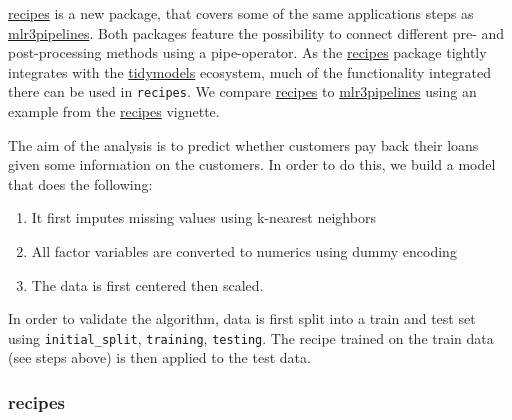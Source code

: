 \documentclass[]{scrbook}
\providecommand{\tightlist}{%
  \setlength{\itemsep}{0pt}\setlength{\parskip}{0pt}}
\begin{document}
\href{https://cran.r-project.org/package=recipes}{recipes} is a new package, that covers some of the same applications steps as \href{https://cran.r-project.org/package=mlr3pipelines}{mlr3pipelines}.
Both packages feature the possibility to connect different pre- and post-processing methods using a pipe-operator.
As the \href{https://cran.r-project.org/package=recipes}{recipes} package tightly integrates with the \href{https://cran.r-project.org/package=tidymodels}{tidymodels} ecosystem, much of the functionality integrated there can be used in \texttt{recipes}.
We compare \href{https://cran.r-project.org/package=recipes}{recipes} to \href{https://cran.r-project.org/package=mlr3pipelines}{mlr3pipelines} using an example from the \href{https://cran.r-project.org/package=recipes}{recipes} vignette.

The aim of the analysis is to predict whether customers pay back their loans given some information on the customers.
In order to do this, we build a model that does the following:

\begin{enumerate}
\def\labelenumi{\arabic{enumi}.}
\tightlist
\item
  It first imputes missing values using k-nearest neighbors
\item
  All factor variables are converted to numerics using dummy encoding
\item
  The data is first centered then scaled.
\end{enumerate}

In order to validate the algorithm, data is first split into a train and test set using \texttt{initial\_split}, \texttt{training}, \texttt{testing}.
The recipe trained on the train data (see steps above) is then applied to the test data.

\hypertarget{recipes}{%
\subsubsection{recipes}\label{recipes}}
\end{document}
